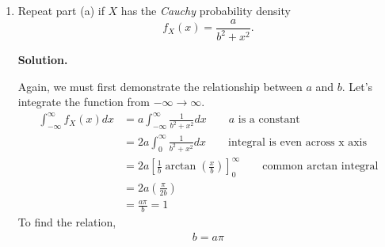 \documentclass[11pt]{article}
\newenvironment{solution}{\par\noindent\textbf{Solution.}\ }{\par\vspace{6pt}}
\begin{document}
\begin{enumerate}[label=(\alph*)]
\begin{solution}
        The second of the two give us:
        \begin{align}
            \int_{0}^{x} \frac{1}{2} e^{-t} dt &= \frac{1}{2} \left[-e^{-t}\right]_{0}^{x}\\
            &= \frac{1}{2} \left(-e^{-x} + 1\right) \\
            &= \frac{-e^{-x}}{2} + \frac{1}{2}
        \end{align}

        Added together, we see for $x \geq 0$:
        \[
            F_X(x) = \frac{1}{2} + \frac{-e^{-x}}{2} + \frac{1}{2} = 1 - e^{-x}\frac{1}{2}
        \]

        Now for the case of $x \le 0$, we know that $|x|$ for $x \le 0$ is $-x$
        \[
            F_X(x) = \int_{-\infty}^{x} f_X(t) = \int_{-\infty}^{x} \frac{1}{2} e^{t} dt
        \]
        Integrating this:
        \begin{align}
            \int_{-\infty}^{x} \frac{1}{2} e^{t} dt &= \frac{1}{2}\left[e^{t}\right]_{-\infty}^{x} \\
            &= \frac{1}{2} (e^{x}) \\
            &= e^{x}\frac{1}{2}
        \end{align}
        Now we have obtained
        \[
            F_X(x) =
            \begin{cases}
                \dfrac{1}{2}e^x & x < 0 \\
                1 - \dfrac{1}{2}e^{-x} & x \geq 0
            \end{cases}
        \]
        Let's do a check for $\lim_{x \to \infty} F_X(x)$ to ensure it's equal to $1$.
        \[
            \lim_{x \to \infty} F_X(x) = 1 - \frac{1}{2}e^{-x} = 1
        \]
        \qed

    \end{solution}

    \item Repeat part (a) if $X$ has the \emph{Cauchy} probability density
    \[
        f_X(x) = \frac{a}{b^2 + x^2}.
    \]

    \begin{solution}

        Again, we must first demonstrate the relationship between $a$ and $b$.
        Let's integrate the function from $-\infty \to \infty$.
        \begin{align}
            \int_{-\infty}^{\infty} f_X(x) dx &= a \int_{-\infty}^{\infty} \frac{1}{b^2 + x^2}dx \qquad \text{$a$ is a constant} \\
            &= 2a \int_{0}^{\infty} \frac{1}{b^2 + x^2} dx \qquad \text{integral is even across x axis} \\
            &= 2a \left[\frac{1}{b}\arctan(\frac{x}{b})\right]_{0}^{\infty} \qquad \text{common arctan integral} \\
            &= 2a (\frac{\pi}{2b}) \\
            &= \frac{a\pi}{b} = 1
        \end{align}
        To find the relation,
        \begin{align}
            b = a\pi
        \end{align}


\end{solution}
\end{enumerate}
\end{document}
